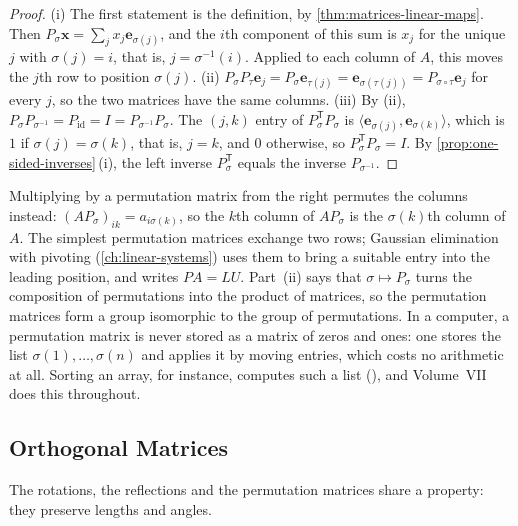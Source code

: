 \begin{proof}
(i) The first statement is the definition, by \cref{thm:matrices-linear-maps}. Then $P_\sigma\mathbf x=\sum_jx_j\mathbf e_{\sigma(j)}$, and the $i$th component of this sum is $x_j$ for the unique $j$ with $\sigma(j)=i$, that is, $j=\sigma^{-1}(i)$. Applied to each column of $A$, this moves the $j$th row to position $\sigma(j)$. (ii) $P_\sigma P_\tau\mathbf e_j=P_\sigma\mathbf e_{\tau(j)}=\mathbf e_{\sigma(\tau(j))}=P_{\sigma\circ\tau}\mathbf e_j$ for every $j$, so the two matrices have the same columns. (iii) By (ii), $P_\sigma P_{\sigma^{-1}}=P_{\operatorname{id}}=I=P_{\sigma^{-1}}P_\sigma$. The $(j,k)$ entry of $P_\sigma^{\mathsf T}P_\sigma$ is $\langle\mathbf e_{\sigma(j)},\mathbf e_{\sigma(k)}\rangle$, which is $1$ if $\sigma(j)=\sigma(k)$, that is, $j=k$, and $0$ otherwise, so $P_\sigma^{\mathsf T}P_\sigma=I$. By \cref{prop:one-sided-inverses}\,(i), the left inverse $P_\sigma^{\mathsf T}$ equals the inverse $P_{\sigma^{-1}}$.
\end{proof}

Multiplying by a permutation matrix from the right permutes the columns instead: $(AP_\sigma)_{ik}=a_{i\sigma(k)}$, so the $k$th column of $AP_\sigma$ is the $\sigma(k)$th column of $A$. The simplest permutation matrices exchange two rows; Gaussian elimination with pivoting (\cref{ch:linear-systems}) uses them to bring a suitable entry into the leading position, and writes $PA=LU$. Part~(ii) says that $\sigma\mapsto P_\sigma$ turns the composition of permutations into the product of matrices, so the permutation matrices form a group isomorphic to the group of permutations. In a computer, a permutation matrix is never stored as a matrix of zeros and ones: one stores the list $\sigma(1),\ldots,\sigma(n)$ and applies it by moving entries, which costs no arithmetic at all. Sorting an array, for instance, computes such a list (), and Volume~VII does this throughout.

\subsection{Orthogonal Matrices}

The rotations, the reflections and the permutation matrices share a property: they preserve lengths and angles.

